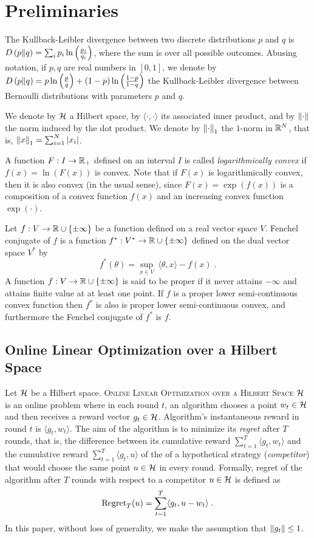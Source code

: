 \section{Preliminaries}

The Kullback-Leibler divergence between two discrete
distributions $p$ and $q$ is $D\left({p}\middle\|{q}\right) = \sum_{i} p_i \ln\left( \frac{p_i}{q_i} \right)$,
where the sum is over all possible outcomes. Abusing notation, if $p,q$ are real
numbers in $[0,1]$, we denote by
$D\left({p}\middle\|{q}\right) = p \ln \left(\frac{p}{q} \right) + (1-p) \ln \left(\frac{1-p}{1-q} \right)$
the Kullback-Leibler divergence between Bernoulli distributions with parameters
$p$ and $q$.

We denote by $\mathcal{H}$ a Hilbert space, by $\langle \cdot, \cdot\rangle$ its
associated inner product, and by $\left\|{\cdot}\right\|$ the norm induced by the dot
product. We denote by $\left\|{\cdot}\right\|_1$ the $1$-norm in $\mathbb{R}^N$, that is,
$\left\|{x}\right\|_1 = \sum_{i=1}^N |x_i|$.

A function $F:I \to \mathbb{R}_+$ defined on an interval $I$ is called
\emph{logarithmically convex} if $f(x) = \ln(F(x))$ is convex. Note that if
$F(x)$ is logarithmically convex, then it is also convex (in the usual sense),
since $F(x) = \exp(f(x))$ is a composition of a convex function $f(x)$ and an
increasing convex function $\exp(\cdot)$.

Let $f:V \to \mathbb{R} \cup \{\pm\infty\}$ be a function defined on a real vector space
$V$. Fenchel conjugate of $f$ is a function $f^*:V^* \to \mathbb{R} \cup \{\pm \infty\}$
defined on the dual vector space $V^*$ by
$$
f^*(\theta) = \sup_{x \in V} \ \langle \theta, x \rangle - f(x) \; .
$$
A function $f:V \to \mathbb{R} \cup \{\pm \infty\}$ is said to be proper if it never
attains $-\infty$ and attains finite value at at least one point. If $f$ is a
proper lower semi-continuous convex function then $f^*$ is also is proper lower
semi-continuous convex, and furthermore the Fenchel conjugate of $f^*$ is $f$.

\subsection{Online Linear Optimization over a Hilbert Space}

Let $\mathcal{H}$ be a Hilbert space. \textsc{Online Linear Optimization over a Hilbert
Space $\mathcal{H}$} is an online problem where in each round $t$, an algorithm chooses a
point $w_t \in \mathcal{H}$ and then receives a reward vector $g_t \in \mathcal{H}$. Algorithm's
instantaneous reward in round $t$ is $\langle g_t, w_t \rangle$. The aim of the
algorithm is to minimize its \emph{regret} after $T$ rounds, that is, the
difference between its cumulative reward $\sum_{t=1}^T \langle g_t, w_t \rangle$
and the cumulative reward $\sum_{t=1}^T \langle g_t, u \rangle$ of the of a
hypothetical strategy (\emph{competitor}) that would choose the same point $u
\in \mathcal{H}$ in every round. Formally, regret of the algorithm after $T$ rounds with
respect to a competitor $u \in \mathcal{H}$ is defined as
\begin{equation}
\label{equation:regret-definition}
\operatorname{Regret}_T(u) = \sum_{t=1}^T \langle g_t , u - w_t \rangle \; .
\end{equation}
In this paper, without loss of generality, we make the assumption that $\left\|{g_t}\right\| \le 1$.


